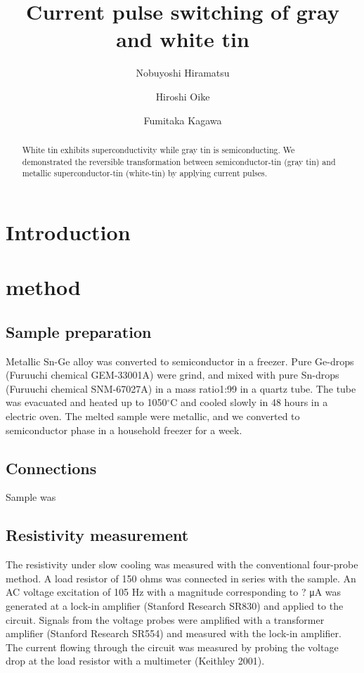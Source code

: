 \documentclass[aip,apl,reprint]{revtex4-1}
\begin{document}
\title{Current pulse switching of gray and white tin} 
\author{Nobuyoshi Hiramatsu}
\author{Hiroshi Oike}
\author{Fumitaka Kagawa}

\begin{abstract}
White tin exhibits superconductivity while gray tin is semiconducting.
We demonstrated the reversible transformation between semiconductor-tin (gray tin) and metallic superconductor-tin (white-tin) by applying current pulses.
\end{abstract}

\maketitle 
\section{Introduction}


\section{method}
\subsection{Sample preparation}
Metallic Sn-Ge alloy was converted to semiconductor in a freezer.
Pure Ge-drops (Furuuchi chemical GEM-33001A) were grind, and mixed with pure Sn-drops (Furuuchi chemical SNM-67027A) in a mass ratio1:99 in a quartz tube. The tube was evacuated and heated up to 1050$^\circ$C and cooled slowly in 48 hours in a electric oven. The melted sample were metallic, and we converted to semiconductor phase in a household freezer for a week. 

\subsection{Connections}
Sample was 

\subsection{Resistivity measurement}
The resistivity under slow cooling was measured with the conventional four-probe method. A load resistor of 150 ohms was connected in series with the sample. An AC voltage excitation of 105 Hz with a magnitude corresponding to ? μA was generated at a lock-in amplifier (Stanford Research SR830) and applied to the circuit. Signals from the voltage probes were amplified with a transformer amplifier (Stanford Research SR554) and measured with the lock-in amplifier. The current flowing through the circuit was measured by probing the voltage drop at the load resistor with a multimeter (Keithley 2001).
\end{document}
